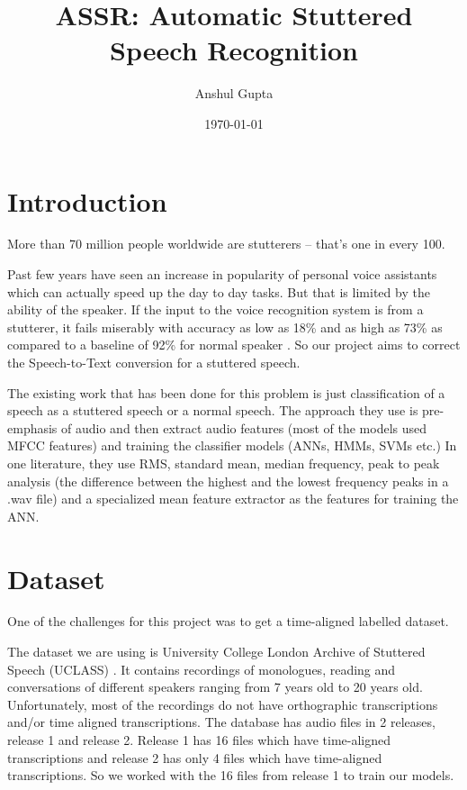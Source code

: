 \documentclass{report}
\title{\textbf{ASSR: Automatic Stuttered Speech Recognition}}
\author{Anshul Gupta}
\date{\today}
\begin{document}
\maketitle

\tableofcontents

\chapter{Introduction}
More than 70 million people worldwide are stutterers -- that's one in every 100.

Past few years have seen an increase in popularity of personal voice assistants which can actually speed up the day to day tasks. But that is limited by the ability of the speaker.
If the input to the voice recognition system is from a stutterer, it fails miserably with accuracy as low as 18\% and as high as 73\% as compared to a baseline of 92\% for normal speaker \cite{siriStats}. So our project aims to correct the Speech-to-Text conversion for a stuttered speech.

The existing work \cite{manuChopra} that has been done for this problem is just classification of a speech as a stuttered speech or a normal speech. The approach they use is pre-emphasis of audio and then extract audio features (most of the models used MFCC features) and training the classifier models (ANNs, HMMs, SVMs etc.)
In one literature, they use RMS, standard mean, median frequency, peak to peak analysis (the difference between the highest and the lowest frequency peaks in a .wav file) and a specialized mean feature extractor as the features for training the ANN.


\chapter{Dataset}
One of the challenges for this project was to get a time-aligned labelled dataset.

The dataset we are using is University College London Archive of Stuttered Speech (UCLASS) \cite{uclass}. It contains recordings of monologues, reading and conversations of different speakers ranging from 7 years old to 20 years old. Unfortunately, most of the recordings do not have orthographic transcriptions and/or time aligned transcriptions. The database has audio files in 2 releases, release 1 and release 2. Release 1 has 16 files which have time-aligned transcriptions and release 2 has only 4 files which have time-aligned transcriptions. So we worked with the 16 files from release 1 to train our models. 
\end{document}
